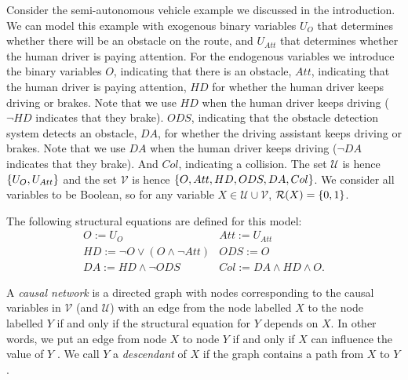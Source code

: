 \begin{example}\label{ex:causal model}
    Consider the semi-autonomous vehicle example we discussed in the introduction. 
    We can model this example with exogenous binary variables $U_O$ that determines whether there will be an obstacle on the route, and $U_{Att}$ that determines whether the human driver is paying attention.
    For the endogenous variables we introduce the binary variables $O$, indicating that there is an obstacle, $Att$, indicating that the human driver is paying attention, $HD$ for whether the human driver keeps driving or brakes. Note that we use $HD$ when the human driver keeps driving ($\neg HD$ indicates that they brake). $ODS$, indicating that the obstacle detection system detects an obstacle, $DA$, for whether the driving assistant keeps driving or brakes. Note that we use $DA$ when the human driver keeps driving ($\neg DA$ indicates that they brake). And $Col$, indicating a collision.
    The set $\mathcal{U}$ is hence $\{ {U_O,U_{Att}} \}$ and the set $\mathcal{V}$ is hence $\{ {O,Att, HD, ODS,DA, Col} \}$.
    We consider all variables to be Boolean, so for any variable $X \in \mathcal{U} \cup \mathcal{V}$, $\mathcal{R}(X) = \{ {0,1} \}$.

    The following structural equations are defined for this model:
    \begin{equation*}
        \begin{array}{ll}
            O := U_O & Att:= U_{Att}  \\
            HD := \neg O \vee (O \wedge \neg Att) & ODS:= O \\
            DA := HD \wedge \neg ODS & Col := DA \wedge HD \wedge O.
        \end{array}
    \end{equation*}
\end{example}


A \emph{causal network} is a directed graph with nodes corresponding to the causal variables in $\mathcal{V}$ (and $\mathcal{U}$) with an edge from the node labelled $X$ to the node labelled $Y$ if and only if the structural equation for $Y$ depends on $X$.
In other words, we put an edge from node $X$ to node $Y$ if and only if $X$ can influence the value of $Y$ \cite{halpern2005causes}.
We call $Y$ a \emph{descendant} of $X$ if the graph contains a path from $X$ to $Y$.


